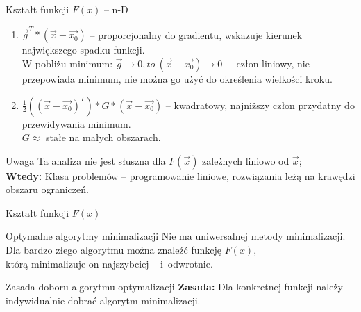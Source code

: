   \begin{frame}{Kształt funkcji $ F(x) $ -- n-D}
    \begin{enumerate}
      \item $ \vec{g}^T * (\vec{x} - \vec{x_0}) $ -- proporcjonalny do
      gradientu, wskazuje kierunek największego spadku funkcji.\\
      W pobliżu minimum: $ \vec{g} \to 0{, to}\ (\vec{x} - \vec{x_0}) \to 0
      \;$ -- człon liniowy, nie przepowiada minimum,
      nie można go użyć do określenia wielkości kroku.

      \item $ \frac{1}{2}((\vec{x} - \vec{x_0})^T) * G * (\vec{x} - \vec{x_0}) $
      -- kwadratowy, najniższy człon przydatny do przewidywania minimum.\\
      $ G \approx $ stałe na małych obszarach.
    \end{enumerate}

    \begin{alertblock}{Uwaga}
      Ta analiza nie jest słuszna dla $ F(\vec{x}) $ zależnych liniowo
      od $ \vec{x} $;\\
      \textbf{Wtedy:} Klasa problemów -- programowanie liniowe, rozwiązania leżą na krawędzi obszaru ograniczeń.
    \end{alertblock}
  \end{frame}

  \begin{frame}{Kształt funkcji $ F(x) $}
    \begin{block}{Optymalne algorytmy minimalizacji}
      Nie ma uniwersalnej metody minimalizacji. \\
      Dla bardzo złego algorytmu można znaleźć funkcję $ F(x) $,\\
      którą minimalizuje on najszybciej -- i~odwrotnie.
    \end{block}
    \begin{block}{Zasada doboru algorytmu optymalizacji}
      \textbf{Zasada:} Dla konkretnej funkcji należy indywidualnie dobrać algorytm minimalizacji.
    \end{block}

  \end{frame}
